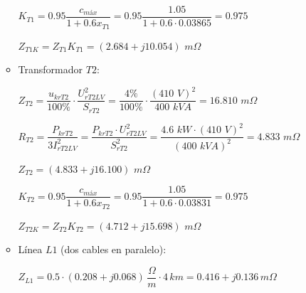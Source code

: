 \begin{enumerate}
\begin{itemize}
                        $K_\textit{T1} = 0.95 \dfrac{c_\textit{máx}}{1 + 0.6 x_\textit{T1}} = 0.95 \dfrac{1.05}{1 + 0.6 \cdot 0.03865} = 0.975$\vspace{2mm}

                        $Z_\textit{T1K} = Z_\textit{T1} K_\textit{T1} = (2.684 + j 10.054) \textit{ m}\varOmega$\vspace{2mm}

                        \item Transformador $T2$:\vspace{2mm}
                        
                        $Z_\textit{T2} = \dfrac{u_\textit{krT2}}{100\%} \cdot \dfrac{U_\textit{rT2LV}^2}{S_\textit{rT2}} = 
                        \dfrac{4\!\text{\%}}{100\!\text{\%}} \cdot \dfrac{(410 \textit{ V})^2}{400 \textit{ kVA}} =
                        16.810 \textit{ m}\varOmega$\vspace{2mm}

                        $R_\textit{T2} = \dfrac{P_\textit{krT2}}{3 I_\textit{rT2LV}^2} = 
                        \dfrac{P_\textit{krT2} \cdot U_\textit{rT2LV}^2}{S_\textit{rT2}^2} = 
                        \dfrac{4.6 \textit{ kW} \cdot (410 \textit{ V})^2}{(400 \textit{ kVA})^2} = 
                        4.833 \textit{ m}\varOmega$\vspace{2mm}

                        $Z_\textit{T2} = 
                        (4.833 + j 16.100) \textit{ m}\varOmega$\vspace{2mm}

                        $K_\textit{T2} = 
                        0.95 \dfrac{c_\textit{máx}}{1 + 0.6 x_\textit{T2}} = 
                        0.95 \dfrac{1.05}{1 + 0.6 \cdot 0.03831} = 0.975$\vspace{2mm}

                        $Z_\textit{T2K} = Z_\textit{T2} K_\textit{T2} = 
                        (4.712 + j 15.698) \textit{ m}\varOmega$\vspace{2mm}

                        \item Línea $L1$ (dos cables en paralelo):\vspace{2mm}
                        
                        $Z_\textit{L1} = 0.5\cdot (0.208+j0.068)\,\dfrac{\varOmega}{\textit{m}}\cdot 4\,\textit{km} = 0.416+j0.136\,\textit{m}\varOmega$


\end{itemize}
\end{enumerate}

